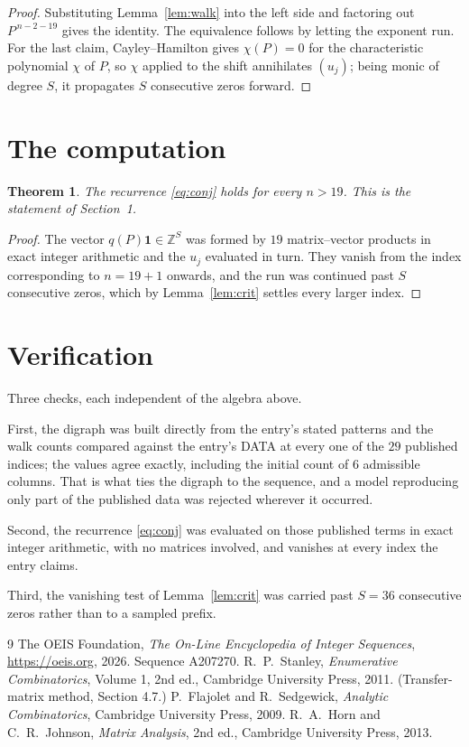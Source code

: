 \documentclass[11pt,a4paper]{article}
\theoremstyle{plain}
\newtheorem{theorem}{Theorem}
\theoremstyle{definition}
\begin{document}
\begin{proof}
Substituting Lemma~\ref{lem:walk} into the left side and factoring out
$P^{\,n-2-19}$ gives the identity. The equivalence follows by letting the exponent
run. For the last claim, Cayley--Hamilton gives $\chi(P)=0$ for the characteristic
polynomial $\chi$ of $P$, so $\chi$ applied to the shift annihilates $(u_j)$; being monic of
degree $S$, it propagates $S$ consecutive zeros forward.
\end{proof}

\section{The computation}

\begin{theorem}
The recurrence \eqref{eq:conj} holds for every $n>19$. This is the statement of
Section~1.
\end{theorem}

\begin{proof}
The vector $q(P)\mathbf{1}\in\mathbb{Z}^{S}$ was formed by $19$ matrix--vector
products in exact integer arithmetic and the $u_j$ evaluated in turn. They vanish from the
index corresponding to $n=19+1$ onwards, and the run was continued past $S$ consecutive
zeros, which by Lemma~\ref{lem:crit} settles every larger index.
\end{proof}

\section{Verification}

Three checks, each independent of the algebra above.

First, the digraph was built directly from the entry's stated patterns and the walk counts
compared against the entry's DATA at every one of the $29$ published indices; the
values agree exactly, including the initial count of $6$ admissible columns. That is
what ties the digraph to the sequence, and a model reproducing only part of the published
data was rejected wherever it occurred.

Second, the recurrence \eqref{eq:conj} was evaluated on those published terms in exact
integer arithmetic, with no matrices involved, and vanishes at every index the entry claims.

Third, the vanishing test of Lemma~\ref{lem:crit} was carried past $S=36$ consecutive
zeros rather than to a sampled prefix.

\begin{thebibliography}{9}
 The OEIS Foundation, \emph{The On-Line Encyclopedia of Integer
Sequences}, \url{https://oeis.org}, 2026. Sequence A207270.
 R.~P.~Stanley, \emph{Enumerative Combinatorics}, Volume 1, 2nd ed.,
Cambridge University Press, 2011. (Transfer-matrix method, Section 4.7.)
 P.~Flajolet and R.~Sedgewick, \emph{Analytic Combinatorics}, Cambridge
University Press, 2009.
 R.~A.~Horn and C.~R.~Johnson, \emph{Matrix Analysis}, 2nd ed., Cambridge
University Press, 2013.
\end{thebibliography}
\end{document}
